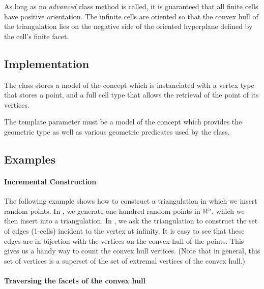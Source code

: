 As long as no \emph{advanced} class method is called, it is guaranteed that
all finite cells have positive orientation. The infinite cells are
oriented so that the convex hull of the triangulation lies on the negative side of
the oriented hyperplane defined by the cell's finite facet.



\subsection{Implementation}

The class  stores a model 
of the concept  which is instanciated with a
vertex type that stores a point, and a full cell type that allows the retrieval
of the point of its vertices.

The template parameter  must be a model of the concept
 which provides the geometric  type as well
as various geometric predicates used by the  class.


\subsection{Examples}

\paragraph{Incremental Construction}

The following example shows how to construct a triangulation in which we insert
random points. In , we generate one hundred random points in
$\mathbb R^5$, which we then insert into a triangulation. In , we 
ask the triangulation to construct the set of edges
($1$-cells) incident to the vertex at infinity. It is easy to see that
these edges are in bijection with the vertices on the convex hull of the
points. This gives us a handy way to count the convex hull vertices. (Note that
in general, this set of vertices is a superset of the set of extremal vertices
of the convex hull.)


\paragraph{Traversing the facets of the convex hull}

